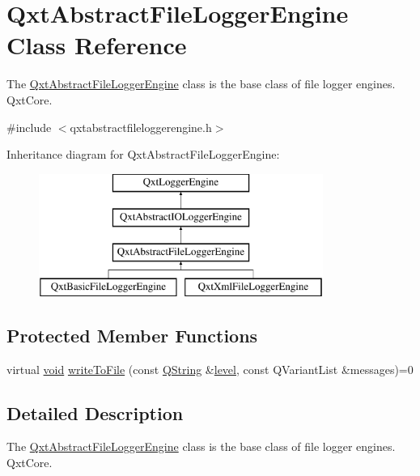 \hypertarget{class_qxt_abstract_file_logger_engine}{\section{Qxt\-Abstract\-File\-Logger\-Engine Class Reference}
\label{class_qxt_abstract_file_logger_engine}
}


The \hyperlink{class_qxt_abstract_file_logger_engine}{Qxt\-Abstract\-File\-Logger\-Engine} class is the base class of file logger engines.  Qxt\-Core.  




{\ttfamily \#include $<$qxtabstractfileloggerengine.\-h$>$}

Inheritance diagram for Qxt\-Abstract\-File\-Logger\-Engine\-:\begin{figure}[H]
\begin{center}
\leavevmode
\includegraphics[height=4.000000cm]{class_qxt_abstract_file_logger_engine}
\end{center}
\end{figure}
\subsection*{Protected Member Functions}
\begin{DoxyCompactItemize}
\item 
virtual \hyperlink{group___u_a_v_objects_plugin_ga444cf2ff3f0ecbe028adce838d373f5c}{void} \hyperlink{class_qxt_abstract_file_logger_engine_ad6eb59b9c89a04e5f583b217b0ff3c89}{write\-To\-File} (const \hyperlink{group___u_a_v_objects_plugin_gab9d252f49c333c94a72f97ce3105a32d}{Q\-String} \&\hyperlink{glext_8h_abc60a79088789bd61297bf5f9ff500d1}{level}, const Q\-Variant\-List \&messages)=0
\end{DoxyCompactItemize}


\subsection{Detailed Description}
The \hyperlink{class_qxt_abstract_file_logger_engine}{Qxt\-Abstract\-File\-Logger\-Engine} class is the base class of file logger engines.  Qxt\-Core. 

